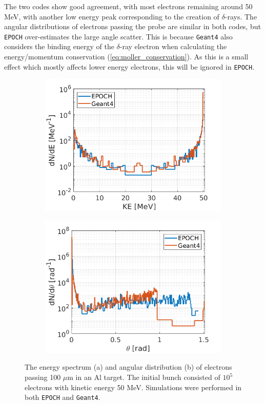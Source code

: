\documentclass[12pt]{article}
\numberwithin{equation}{section}
\begin{document}
The two codes show good agreement, with most electrons remaining around 50 MeV, with another low energy peak corresponding to the creation of $\delta$-rays. The angular distributions of electrons passing the probe are similar in both codes, but \texttt{EPOCH} over-estimates the large angle scatter. This is because \texttt{Geant4} also considers the binding energy of the $\delta$-ray electron when calculating the energy/momentum conservation (\ref{eq:moller_conservation}). As this is a small effect which mostly affects lower energy electrons, this will be ignored in \texttt{EPOCH}.

\begin{figure}
\centering
\begin{subfigure}{.49\textwidth}
  \centering
  \includegraphics[width=1\linewidth]{Figures/bench_G4delta_E.png}
  \caption{}
\end{subfigure}%
\begin{subfigure}{.49\textwidth}
  \centering
  \includegraphics[width=1\linewidth]{Figures/bench_G4delta_ang.png}
  \caption{}
\end{subfigure}
\caption{The energy spectrum (a) and angular distribution (b) of electrons passing 100 $\mu$m in an Al target. The initial bunch consisted of $10^5$ electrons with kinetic energy 50 MeV. Simulations were performed in both \texttt{EPOCH} and \texttt{Geant4}.}
\label{fig:bench:G4delta}
\end{figure}
\end{document}
